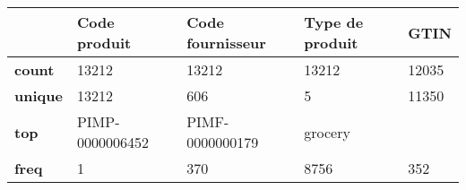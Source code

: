 \begin{tabularx}{\linewidth}{lXXXX}
\toprule
{} &     Code produit & Code fournisseur & Type de produit &   GTIN \\
\midrule
\textbf{count } &            13212 &            13212 &           13212 &  12035 \\
\textbf{unique} &            13212 &              606 &               5 &  11350 \\
\textbf{top   } &  PIMP-0000006452 &  PIMF-0000000179 &         grocery &        \\
\textbf{freq  } &                1 &              370 &            8756 &    352 \\
\bottomrule
\end{tabularx}
